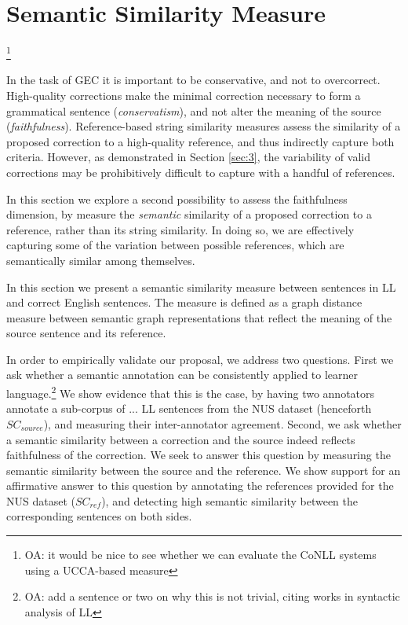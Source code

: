 \documentclass[english]{article}
\newcommand{\oa}[1]{\footnote{\color{red}OA: #1}}
\begin{document}
\section{Semantic Similarity Measure}\label{sec:Semantics}



\oa{it would be nice to see whether we can evaluate the CoNLL systems using
a UCCA-based measure}


In the task of GEC it is important to be
conservative, and not to overcorrect. High-quality corrections make the minimal correction
necessary to form a grammatical sentence (\textit{conservatism}), and not alter the
meaning of the source (\textit{faithfulness}). Reference-based string similarity measures
assess the similarity of a proposed correction to a high-quality reference, 
and thus indirectly capture both criteria. However, as demonstrated in Section \ref{sec:3},
the variability of valid corrections may be prohibitively difficult
to capture with a handful of references.

In this section we explore a second possibility to assess the faithfulness dimension, by
measure the {\it semantic} similarity of a proposed correction to a reference, rather
than its string similarity. In doing so, we are effectively capturing some of the variation
between possible references, which are semantically similar among themselves.

In this section we present a semantic similarity measure between sentences in LL and
correct English sentences. The measure is defined as a graph distance measure between
semantic graph representations that reflect the meaning of the source sentence and its
reference. 

In order to empirically validate our proposal, we address two
questions. First we ask whether a semantic annotation can be consistently
applied to learner language.\oa{add a sentence or two on why this is not
  trivial, citing works in syntactic analysis of LL} We show evidence
that this is the case, by having two annotators annotate a sub-corpus of ... LL sentences from
the NUS dataset (henceforth $SC_{source}$), and measuring their inter-annotator agreement.
Second, we ask whether a semantic similarity between a correction and the source indeed
reflects faithfulness of the correction. We seek to answer this question by measuring
the semantic similarity between the source and the reference. We show support for
an affirmative answer to this question 
by annotating the references provided for the NUS dataset ($SC_{ref}$),
and detecting high semantic similarity between the corresponding sentences on both
sides. 
\end{document}
